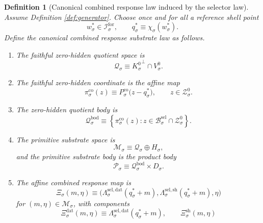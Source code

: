 \documentclass[11pt]{article}
\newcommand{\ForSpace}[1]{\mathcal I_{#1}^{\mathrm{for}}}
\newcommand{\ProtoSpace}[1]{\mathcal M_{#1}}
\newcommand{\ProtoBody}[1]{\mathcal P_{#1}}
\newcommand{\ResponseMap}[1]{\Xi_{#1}}
\newcommand{\ResponseData}[1]{\Xi_{#1}^{\mathrm{dat}}}
\newcommand{\ResponseShell}[1]{\Xi_{#1}^{\mathrm{sh}}}
\newcommand{\GapSpace}[1]{H_{#1}}
\newcommand{\GapBody}[1]{D_{#1}}
\newcommand{\GenBody}[1]{\mathcal B_{#1}^{\mathrm{sel}}}
\newcommand{\GenData}[1]{\Lambda_{#1}^{\mathrm{sel,dat}}}
\newcommand{\GenShell}[1]{\Lambda_{#1}^{\mathrm{sel,sh}}}
\newcommand{\ZeroHiddenSlice}[1]{\mathcal Z_{#1}^{0}}
\newcommand{\ZeroHiddenVec}[1]{V_{#1}^{0}}
\newcommand{\GenEmbed}[1]{\chi_{#1}}
\newcommand{\Kernel}[1]{K_{#1}^{0}}
\newcommand{\StateComp}[1]{P_{#1}^{\mathrm{co}}}
\newcommand{\CoreState}[1]{\mathcal Q_{#1}}
\newcommand{\ReferencePoint}[1]{q_{#1}^{\ast}}
\newcommand{\CoreCoord}[1]{\pi_{#1}^{\mathrm{co}}}
\newcommand{\CoreBody}[1]{\mathcal Q_{#1}^{\mathrm{bod}}}
\newtheorem{definition}{Definition}
\begin{document}
\begin{definition}[Canonical combined response law induced by the selector law]
\label{def:canonical}
Assume Definition \ref{def:generator}. Choose once and for all a reference shell point
\[
w_{\sigma}^{\ast}\in\ForSpace{\sigma},
\qquad
\ReferencePoint{\sigma}\equiv \GenEmbed{\sigma}(w_{\sigma}^{\ast}).
\]
Define the canonical combined response substrate law as follows.
\begin{enumerate}
    \item The faithful zero-hidden quotient space is
    \[
    \CoreState{\sigma}
    \equiv
    {\Kernel{\sigma}}^{\perp}\cap\ZeroHiddenVec{\sigma}.
    \]
    \item The faithful zero-hidden coordinate is the affine map
    \begin{equation}
    \CoreCoord{\sigma}(z)
    \equiv
    \StateComp{\sigma}\bigl(z-\ReferencePoint{\sigma}\bigr),
    \qquad
    z\in\ZeroHiddenSlice{\sigma}.
    \label{eq:corecoord}
    \end{equation}
    \item The zero-hidden quotient body is
    \begin{equation}
    \CoreBody{\sigma}
    \equiv
    \left\{
    \CoreCoord{\sigma}(z):
    z\in\GenBody{\sigma}\cap\ZeroHiddenSlice{\sigma}
    \right\}.
    \label{eq:corebody}
    \end{equation}
    \item The primitive substrate space is
    \begin{equation}
    \ProtoSpace{\sigma}
    \equiv
    \CoreState{\sigma}\oplus\GapSpace{\sigma},
    \label{eq:protospace}
    \end{equation}
    and the primitive substrate body is the product body
    \begin{equation}
    \ProtoBody{\sigma}
    \equiv
    \CoreBody{\sigma}\times\GapBody{\sigma}.
    \label{eq:protobody}
    \end{equation}
    \item The affine combined response map is
    \begin{equation}
    \ResponseMap{\sigma}(m,\eta)
    \equiv
    \bigl(
    \GenData{\sigma}(\ReferencePoint{\sigma}+m),
    \GenShell{\sigma}(\ReferencePoint{\sigma}+m),
    \eta
    \bigr)
    \label{eq:responsemap}
    \end{equation}
    for \((m,\eta)\in\ProtoSpace{\sigma}\), with components
    \[
    \ResponseData{\sigma}(m,\eta)
    \equiv
    \GenData{\sigma}(\ReferencePoint{\sigma}+m),
    \qquad
    \ResponseShell{\sigma}(m,\eta)
\]
\end{enumerate}
\end{definition}
\end{document}
